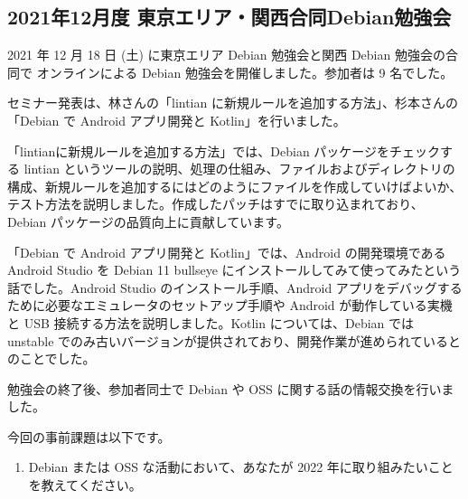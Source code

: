 \documentclass[mingoth,a4paper]{jsarticle}
\begin{document}

\subsection{2021年12月度 東京エリア・関西合同Debian勉強会}

2021 年 12 月 18 日 (土) に東京エリア Debian 勉強会と関西 Debian 勉強会の合同で
オンラインによる Debian 勉強会を開催しました。参加者は 9 名でした。

セミナー発表は、林さんの「lintian に新規ルールを追加する方法」、杉本さんの「Debian で Android アプリ開発と Kotlin」を行いました。

「lintianに新規ルールを追加する方法」では、Debian パッケージをチェックする lintian というツールの説明、処理の仕組み、ファイルおよびディレクトリの構成、新規ルールを追加するにはどのようにファイルを作成していけばよいか、テスト方法を説明しました。作成したパッチはすでに取り込まれており、Debian パッケージの品質向上に貢献しています。

「Debian で Android アプリ開発と Kotlin」では、Android の開発環境である Android Studio を Debian 11 bullseye にインストールしてみて使ってみたという話でした。Android Studio のインストール手順、Android アプリをデバッグするために必要なエミュレータのセットアップ手順や Android が動作している実機と USB 接続する方法を説明しました。Kotlin については、Debian では unstable でのみ古いバージョンが提供されており、開発作業が進められているとのことでした。

勉強会の終了後、参加者同士で Debian や OSS に関する話の情報交換を行いました。



今回の事前課題は以下です。

\begin{enumerate}
  \item Debian または OSS な活動において、あなたが 2022 年に取り組みたいことを教えてください。
\end{enumerate}


\begin{multicols}{2}
{\small

}
\end{multicols}

%
%
%
%
\end{document}
